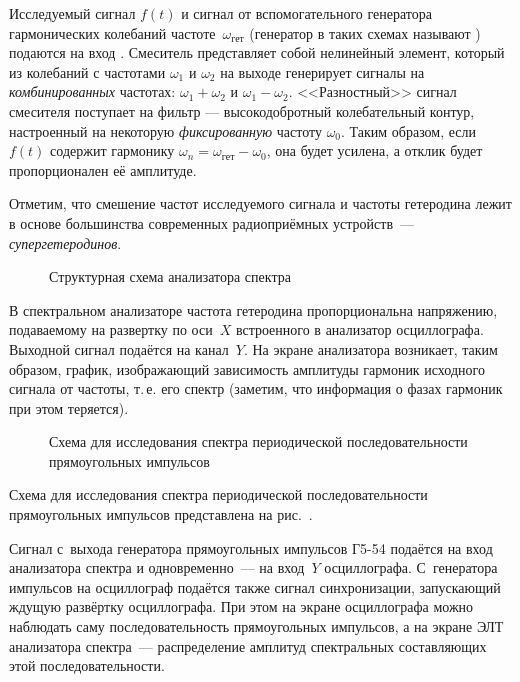 Исследуемый сигнал $f(t)$ и сигнал от вспомогательного генератора гармонических
колебаний частоте~$\omega_{гет}$ (генератор в таких схемах называют
) подаются на вход . Смеситель
представляет собой нелинейный элемент, который из колебаний с частотами
$\omega_1$ и $\omega_2$ на выходе генерирует сигналы на \emph{комбинированных}
частотах: $\omega_1 + \omega_2$ и $\omega_1 - \omega_2$.
<<Разностный>> сигнал смесителя поступает на фильтр ---
высокодобротный колебательный контур, настроенный на некоторую \emph{фиксированную}
частоту $\omega_0$. Таким образом, если $f(t)$ содержит гармонику
$\omega_n=\omega_{гет}-\omega_0$, она будет усилена, а отклик будет
пропорционален её амплитуде.

Отметим, что смешение частот исследуемого сигнала и частоты гетеродина лежит в
основе большинства современных радиоприёмных устройств~---
\emph{супергетеродинов}.

\begin{figure}[h!]
\hfil
{}
\caption{Структурная схема анализатора спектра}
\end{figure}

В спектральном анализаторе частота гетеродина пропорциональна напряжению,
подаваемому на развертку по оси~$X$ встроенного в анализатор осциллографа.
Выходной сигнал подаётся на канал~$Y$. На экране анализатора возникает, таким
образом, график, изображающий зависимость амплитуды гармоник исходного сигнала
от частоты, т.\,е. его спектр (заметим, что информация о фазах гармоник при этом
теряется).

\experiment


\begin{figure}[h!]
\centering
{}
\caption{Схема для исследования спектра периодической последовательности
прямоугольных импульсов}
\end{figure}

Схема для исследования спектра периодической последовательности прямоугольных
импульсов представлена на рис.~.

Сигнал с~выхода генератора прямоугольных импульсов Г5-54 подаётся на вход
анализатора спектра и одновременно~--- на вход~$Y$ осциллографа. С~генератора
импульсов на осциллограф подаётся также сигнал синхронизации, запускающий ждущую
развёртку осциллографа. При этом на экране осциллографа можно наблюдать саму
последовательность прямоугольных импульсов, а на экране ЭЛТ анализатора
спектра~--- распределение амплитуд спектральных составляющих этой
последовательности.

